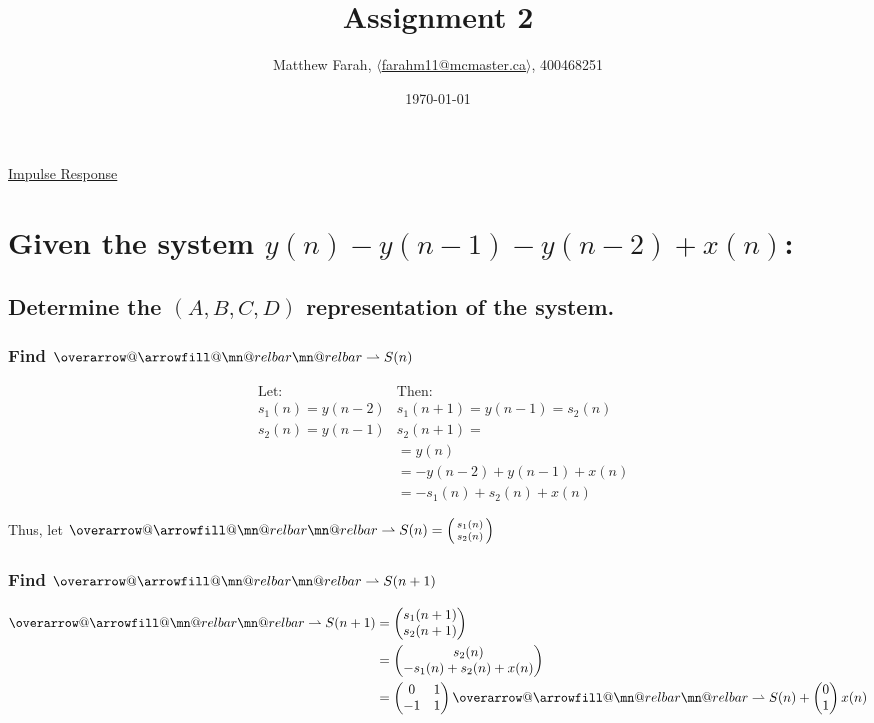 \documentclass{article}
\title{Assignment 2}
\author{Matthew Farah, \href{mailto:farahm11@mcmaster.ca}{$\langle$farahm11@mcmaster.ca$\rangle$}, 400468251}
\date{\today}
\makeatletter
\renewcommand{\thesubsection}{\thesection.\alph{subsection}}
\renewcommand{\thesubsubsection}{\thesection.\alph{subsection}.\Roman{subsubsection}}
\DeclareRobustCommand{\overrightharpoon}{\mathpalette{\overarrow@\rightharpoonfill@}}
\def\rightharpoonfill@{\arrowfill@\mn@relbar\mn@relbar\rightharpoonup}
\makeatother
\begin{document}
\maketitle
\pagestyle{fancy}

\begin{center}
	\Large{\underline{Impulse Response}}
\end{center}
\section[Question ~\thesection]{Given the system $y(n) - y(n - 1) - y(n - 2) + x(n)$:}

\subsection[~\thesubsection]{Determine the $(A, B , C, D)$ representation of the system.}

\subsubsection[~\thesubsubsection]{Find $\overrightharpoon{S(n)}$}

\begin{align*}
	&\text{Let:}& \text{Then:} \\
	&s_1(n) = y(n - 2) &s_1(n + 1) = y(n - 1) = s_2(n) \\
	&s_2(n) = y(n - 1) &s_2(n + 1) = \\
	& &= y(n) \\
	& &= -y(n - 2) + y(n - 1) + x(n) \\
	& &=-s_1(n) + s_2(n) + x(n)
\end{align*}

Thus, let $\overrightharpoon{S(n)} = \begin{psmallmatrix} s_1(n) \\ s_2(n)\end{psmallmatrix}$

\subsubsection[~\thesubsubsection]{Find $\overrightharpoon{S(n + 1)}$}

\begin{align*}
	\overrightharpoon{S(n + 1)} &= \begin{pmatrix} s_1(n + 1) \\ s_2(n + 1) \end{pmatrix} \\
	&= \begin{pmatrix} s_2(n) \\ -s_1(n) + s_2(n) + x(n) \end{pmatrix} \\
	&= \begin{pmatrix} 0 & 1 \\ -1 & 1 \end{pmatrix}\overrightharpoon{S(n)} + \begin{pmatrix} 0 \\ 1\end{pmatrix}x(n)
\end{align*}
\end{document}
